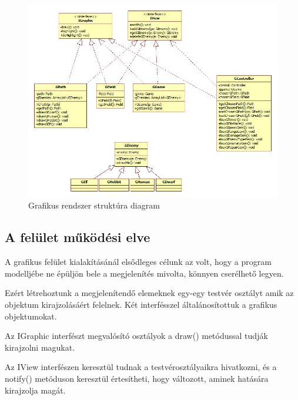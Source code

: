 \begin{figure}[H]
\begin{center}
\includegraphics[width=17cm]{chapters/chapter11/images/GraphClassesD.jpg}
\caption{Grafikus rendszer struktúra diagram}
\label{fig:Grafikus_struktura}
\end{center}
\end{figure}

\subsection{A felület működési elve}

A grafikus felület kialakításánál elsődleges célunk az volt, hogy a program modelljébe ne épüljön bele a megjelenítés  mivolta, könnyen cserélhető legyen.

Ezért létrehoztunk a megjelenítendő elemeknek egy-egy testvér osztályt amik az objektum kirajzolásáért felelnek.
Két interfésszel általánosítottuk a grafikus objektumokat.

Az IGraphic interfészt megvalósító osztályok a draw() metódussal tudják kirajzolni magukat.

Az IView interfészen keresztül tudnak a testvérosztályaikra hivatkozni, és a notify() metóduson keresztül értesítheti, hogy változott, aminek hatására kirajzolja magát.


